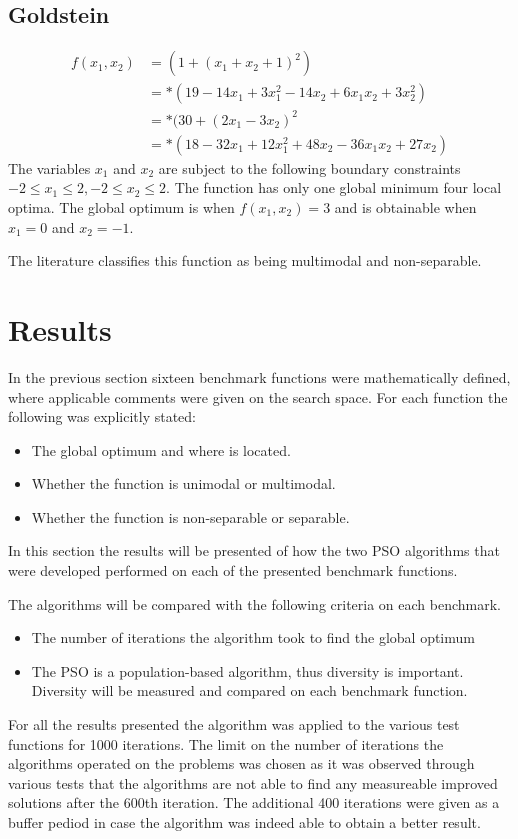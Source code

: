 \subsection{Goldstein}
\begin{align}
	f(x_1,x_2) &= (1 + (x_1 + x_2 + 1)^2)\nonumber\\
			   &=*(19-14x_1+3x_1^2 -14x_2 + 6x_1x_2 + 3x_2^2)\nonumber\\
			   &=*(30 + (2x_1 -3x_2)^2\nonumber\\
			   &=*(18 - 32x_1 + 12x_1^2 +48x_2 -36x_1x_2 + 27x_2)\nonumber
\end{align}
The variables $x_1$ and $x_2$ are subject to the following boundary constraints $-2 \leq x_1 \leq 2, -2 \leq x_2 \leq 2$\cite{ABCCompareStudy,TSGlobalOptimization,TSGlobalOptContinFunc,ContinACSTS,TestFunctions}. The function has only one global minimum four local optima\cite{ABCCompareStudy,TSGlobalOptimization}. The global optimum is when $f(x_1,x_2) = 3$ and is obtainable when $x_1 = 0$ and $x_2 = -1$\cite{ABCCompareStudy,TSGlobalOptimization,TSGlobalOptContinFunc,ContinACSTS,TestFunctions}.

The literature classifies this function as being multimodal and non-separable\cite{ABCCompareStudy}.

\section{Results}
\label{sec:benchResults}
In the previous section sixteen benchmark functions were mathematically defined, where applicable comments were given on the search space. For each function the following was explicitly stated:
\begin{itemize}
\item The global optimum and where is located.
\item Whether the function is unimodal or multimodal.
\item Whether the function is non-separable or separable.
\end{itemize}
In this section the results will be presented of how the two PSO algorithms that were developed performed on each of the presented benchmark functions. 

The algorithms will be compared with the following criteria on each benchmark.
\begin{itemize}
\item The number of iterations the algorithm took to find the global optimum
\item The PSO is a population-based algorithm, thus diversity is important. Diversity will be measured and compared on each benchmark function.
\end{itemize}
For all the results presented the algorithm was applied to the various test functions for 1000 iterations. The limit on the number of iterations the algorithms operated on the problems was chosen as it was observed through various tests that the algorithms are not able to find any measureable improved solutions after the 600th iteration. The additional 400 iterations were given as a buffer pediod in case the algorithm was indeed able to obtain a better result.


